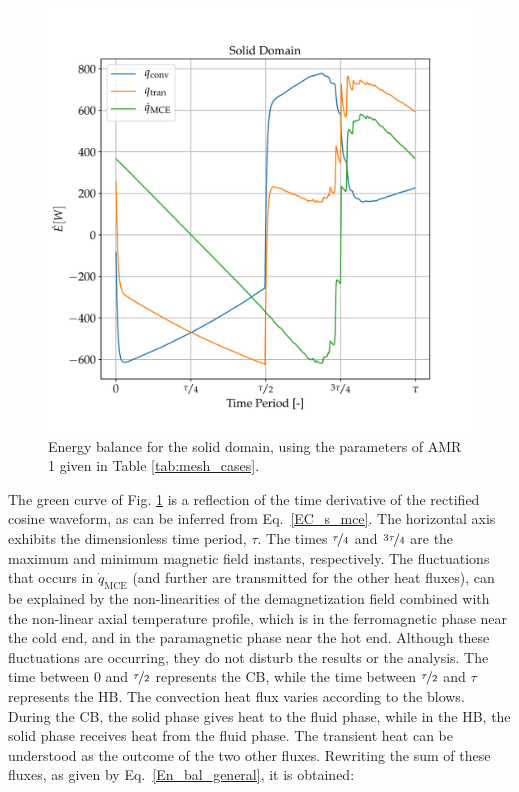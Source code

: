 \documentclass[review,preprint,12pt]{elsarticle}
\begin{document}
\begin{figure}[!ht]
  \centering
  \includegraphics[scale=0.6]{CE_solid_1.pdf}
  \caption{Energy balance for the solid domain, using the parameters of AMR 1 given in Table \ref{tab:mesh_cases}.}
  \label{fig:CE_solid_1}
\end{figure}

The green curve of Fig. \ref{fig:CE_solid_1} is a reflection of the time derivative of the rectified cosine waveform, as can be inferred from Eq.~\eqref{EC_s_mce}. The horizontal axis exhibits the dimensionless time period, $\tau$. The times $\nicefrac{\tau}{4}$ and $\nicefrac{3\tau}{4}$ are the maximum and minimum magnetic field instants, respectively. The fluctuations that occurs in $\dot{q}_\textrm{MCE}$ (and further are transmitted for the other heat fluxes), can be explained by the non-linearities of the demagnetization field combined with the non-linear axial temperature profile, which is in the ferromagnetic phase near the cold end, and in the paramagnetic phase near the hot end. Although these fluctuations are occurring, they do not disturb the results or the analysis. The time between $0$ and $\nicefrac{\tau}{2}$ represents the CB, while the time between $\nicefrac{\tau}{2}$ and $\tau$ represents the HB. The convection heat flux varies according to the blows. During the CB, the solid phase gives heat to the fluid phase, while in the HB, the solid phase receives heat from the fluid phase. The transient heat can be understood as the outcome of the two other fluxes. Rewriting the sum of these fluxes, as given by Eq.~\eqref{En_bal_general}, it is obtained:
\end{document}
